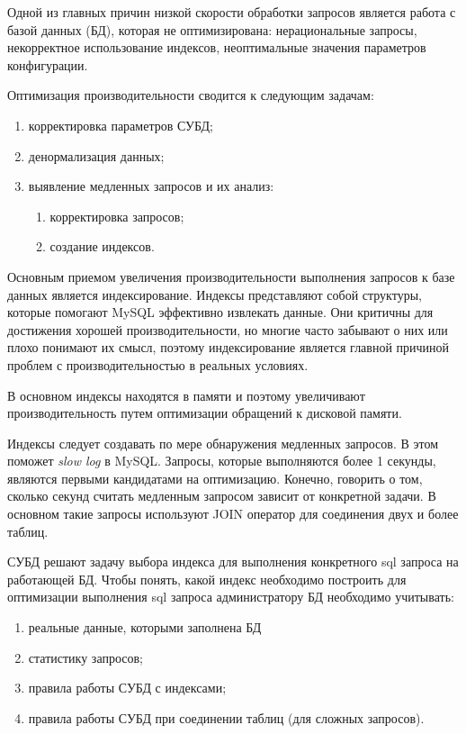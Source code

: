 \Introduction

Одной из главных причин низкой скорости обработки запросов является работа с базой данных (БД), которая не оптимизирована: нерациональные запросы, некорректное использование индексов, неоптимальные значения параметров конфигурации. 

Оптимизация производительности сводится к следующим задачам: 
\begin{enumerate}
\item корректировка параметров СУБД;
\item денормализация данных;
\item выявление медленных запросов и их анализ:
    \begin{enumerate}
    \item корректировка запросов;
    \item создание индексов.
    \end{enumerate}
\end{enumerate}

Основным приемом увеличения производительности выполнения запросов к базе данных является индексирование. Индексы представляют собой структуры, которые помогают MySQL эффективно извлекать данные. Они критичны для достижения хорошей производительности, но многие часто забывают о них или плохо понимают их смысл, поэтому индексирование является главной причиной проблем с производительностью в реальных условиях. \cite{zaitsev}

В основном индексы находятся в памяти и поэтому увеличивают производительность путем оптимизации обращений к дисковой памяти.

Индексы следует создавать по мере обнаружения медленных запросов. В этом поможет \textit{slow log} в MySQL. Запросы, которые выполняются более 1 секунды, являются первыми кандидатами на оптимизацию. \cite{ruhighload-mysql-indexes} Конечно, говорить о том, сколько секунд считать медленным запросом зависит от конкретной задачи. В основном такие запросы используют JOIN оператор для соединения двух и более таблиц.

СУБД решают задачу выбора индекса для выполнения конкретного sql запроса на работающей БД. Чтобы понять, какой индекс необходимо построить для оптимизации выполнения sql запроса администратору БД необходимо учитывать:
\begin{enumerate}
    \item реальные данные, которыми заполнена БД
    \item статистику запросов;
    \item правила работы СУБД с индексами;
    \item правила работы СУБД при соединении таблиц (для сложных запросов).
\end{enumerate}

